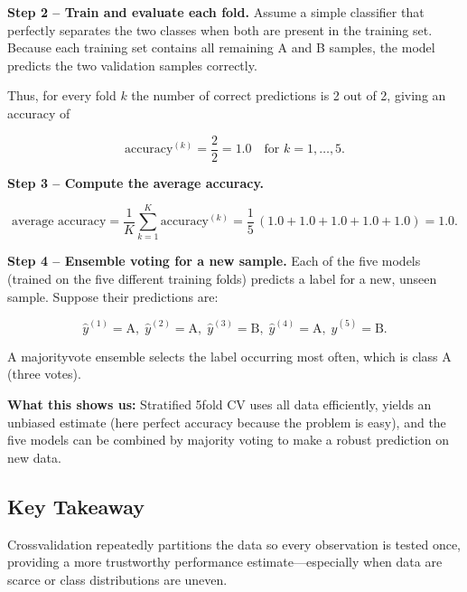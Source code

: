 \documentclass[12pt, a4paper]{article}
\begin{document}
\textbf{Step 2 -- Train and evaluate each fold.}  
Assume a simple classifier that perfectly separates the two classes when both are present in the training set.  
Because each training set contains all remaining A and B samples, the model predicts the two validation samples correctly.  

Thus, for every fold \(k\) the number of correct predictions is 2 out of 2, giving an accuracy of  

\[
\text{accuracy}^{(k)} = \frac{2}{2}=1.0 \quad\text{for }k=1,\dots,5.
\]

\textbf{Step 3 -- Compute the average accuracy.}  

\[
\text{average accuracy}= \frac{1}{K}\sum_{k=1}^{K}\text{accuracy}^{(k)}
= \frac{1}{5}\,(1.0+1.0+1.0+1.0+1.0)=1.0.
\]

\textbf{Step 4 -- Ensemble voting for a new sample.}  
Each of the five models (trained on the five different training folds) predicts a label for a new, unseen sample.  
Suppose their predictions are:  

\[
\hat{y}^{(1)}=\text{A},\;
\hat{y}^{(2)}=\text{A},\;
\hat{y}^{(3)}=\text{B},\;
\hat{y}^{(4)}=\text{A},\;
\hat{y}^{(5)}=\text{B}.
\]

A majorityvote ensemble selects the label occurring most often, which is class A (three votes).  

\textbf{What this shows us:}  
Stratified 5fold CV uses all data efficiently, yields an unbiased estimate (here perfect accuracy because the problem is easy), and the five models can be combined by majority voting to make a robust prediction on new data.  

\subsection{Key Takeaway}
Crossvalidation repeatedly partitions the data so every observation is tested once, providing a more trustworthy performance estimate---especially when data are scarce or class distributions are uneven.
\end{document}
